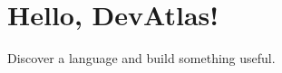 \documentclass{article}
\begin{document}
\section*{Hello, DevAtlas!}
Discover a language and build something useful.
\end{document}
